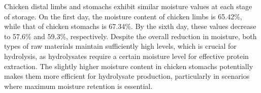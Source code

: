 % 
% 
% 
% 
% 
% 
% 
% 
% 
% 
% 
% 
% 
% 
% 
% 
% 
% 
% 
% 
% 
% 
% 
% 
% 
% 
% 

Chicken distal limbs and stomachs exhibit similar moisture values at
each stage of storage. On the first day, the moisture content of chicken
limbs is 65.42\%, while that of chicken stomachs is 67.34\%. By the
sixth day, these values decrease to 57.6\% and 59.3\%, respectively.
Despite the overall reduction in moisture, both types of raw materials
maintain sufficiently high levels, which is crucial for hydrolysis, as
hydrolysates require a certain moisture level for effective protein
extraction. The slightly higher moisture content in chicken stomachs
potentially makes them more efficient for hydrolysate production,
particularly in scenarios where maximum moisture retention is essential.

